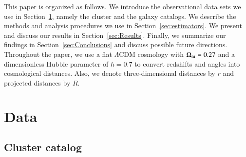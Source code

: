 \documentclass[iop, apjl, twocolappendix, numberedappendix]{emulateapj}
\begin{document}
This paper is organized as follows. We introduce the observational
data sets we use in Section~\ref{sec:data}, namely the cluster and the
galaxy catalogs. We describe the methods and analysis procedures we
use in Section~\ref{sec:estimators}. We present and discuss our
results in Section~\ref{sec:Results}. Finally, we summarize our
findings in Section~\ref{sec:Conclusions} and discuss possible future
directions. Throughout the paper, we use a flat $\Lambda$CDM cosmology
with $\Omega_{\rm m}=0.27$ and a dimensionless Hubble parameter of $h=0.7$ 
to convert redshifts and angles into
cosmological distances. Also, we denote three-dimensional distances by
$r$ and projected distances by $R$.


\section{Data}
\label{sec:data}

\subsection{Cluster catalog}
\label{sec:clusters}
\end{document}
